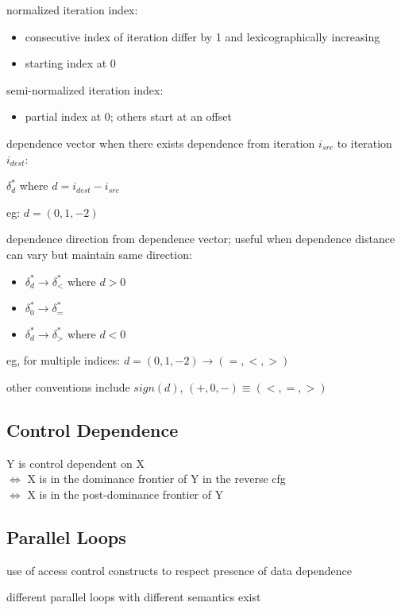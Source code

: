 \documentclass[8pt]{extarticle}
\begin{document}
\begin{multicols*}{2}
  normalized iteration index:
  \begin{itemize}
  \item consecutive index of iteration differ by 1 and lexicographically increasing
  \item starting index at 0
  \end{itemize}

  semi-normalized iteration index:
  \begin{itemize}
  \item partial index at 0; others start at an offset
  \end{itemize}

  dependence vector when there exists dependence from iteration $i_{src}$ to iteration $i_{dest}$:
  
  $\delta_d^*$ where $d = i_{dest} - i_{src}$
  
  eg: $d=(0, 1, -2)$

  dependence direction from dependence vector; useful when dependence distance can vary but maintain same direction:
  \begin{itemize}
  \item $\delta_d^* \rightarrow \delta_<^*$ where $d>0$
  \item $\delta_0^* \rightarrow \delta_=^*$
  \item $\delta_d^* \rightarrow \delta_>^*$ where $d<0$
  \end{itemize}

  eg, for multiple indices: $d=(0, 1, -2) \rightarrow (=, <, >)$

  other conventions include $sign(d)$, $(+,0,-) \equiv (<,=,>)$

  \subsection{Control Dependence}
  
  Y is control dependent on X\\
  $\iff$ X is in the dominance frontier of Y in the reverse cfg\\
  $\iff$ X is in the post-dominance frontier of Y
  
  \subsection{Parallel Loops}

  use of access control constructs to respect presence of data dependence

  different parallel loops with different semantics exist
  

\end{multicols*}
\end{document}
